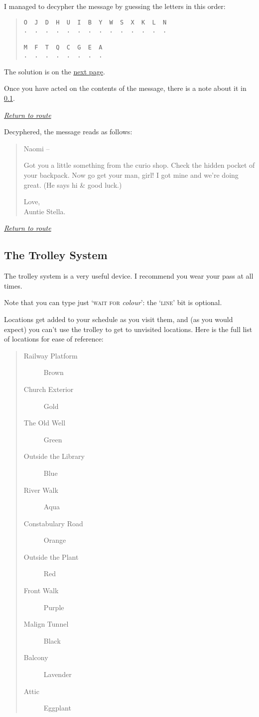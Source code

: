 \documentclass[a5paper]{extarticle}
\begin{document}
I managed to decypher the message by guessing the letters in this order:

\begin{quote}
\begin{verbatim}
O  J  D  H  U  I  B  Y  W  S  X  K  L  N
.  .  .  .  .  .  .  .  .  .  .  .  .  .

M  F  T  Q  C  G  E  A
.  .  .  .  .  .  .  .
\end{verbatim}
\end{quote}

The solution is on the \hyperref[sec:nb-cyphered-message-sol]{next page}.

Once you have acted on the contents of the message, there is a note about it in
\cref{sec:nb-trolley-system}.

\hyperref[sec:route-1]{\emph{Return to route}}

\newpage{}\label{sec:nb-cyphered-message-sol}
Decyphered, the message reads as follows:

\begin{quote}
Naomi --

Got you a little something from the curio shop. Check the hidden pocket of your backpack. Now go get your man, girl! I got mine and we’re doing great. (He says hi \& good luck.)

Love,\\
Auntie Stella.
\end{quote}

\hyperref[sec:route-1]{\emph{Return to route}}

\newpage
\subsection{The Trolley System}\label{sec:nb-trolley-system}

The trolley system is a very useful device.
I recommend you wear your pass at all times.

Note that you can type just ‘\textsc{wait for} \emph{colour}’:
the ‘\textsc{line}’ bit is optional.

Locations get added to your schedule as you visit them,
and (as you would expect) you can't use the trolley to get to unvisited locations.
Here is the full list of locations for ease of reference:

\begin{quote}
\begin{description}
\item[Railway Platform] Brown
\item[Church Exterior] Gold
\item[The Old Well] Green
\item[Outside the Library] Blue
\item[River Walk] Aqua
\item[Constabulary Road] Orange
\item[Outside the Plant] Red
\item[Front Walk] Purple
\item[Malign Tunnel] Black
\item[Balcony] Lavender
\item[Attic] Eggplant
\end{description}
\end{quote}
\end{document}
